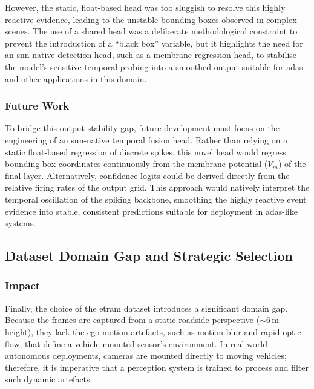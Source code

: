 However, the static, float-based head was too sluggish to resolve this highly reactive evidence, leading to the unstable bounding boxes observed in complex scenes. 
The use of a shared head was a deliberate methodological constraint to prevent the introduction of a ``black box'' variable, but it highlights the need for an \gls{snn}-native detection head, such as a membrane-regression head, to stabilise the model's sensitive temporal probing into a smoothed output suitable for \gls{adas} and other applications in this domain.

\subsubsection*{Future Work}
To bridge this output stability gap, future development must focus on the engineering of an \gls{snn}-native temporal fusion head. Rather than relying on a static float-based regression of discrete spikes, this novel head would regress bounding box coordinates continuously from the membrane potential ($V_m$) of the final layer. Alternatively, confidence logits could be derived directly from the relative firing rates of the output grid. 
This approach would natively interpret the temporal oscillation of the spiking backbone, smoothing the highly reactive event evidence into stable, consistent predictions suitable for deployment in \gls{adas}-like systems.

\subsection{Dataset Domain Gap and Strategic Selection}

\subsubsection*{Impact}
Finally, the choice of the \gls{etram} dataset \parencite{Verma_2024_CVPR} introduces a significant domain gap. 
Because the frames are captured from a static roadside perspective ($\sim$6\,m height), they lack the ego-motion artefacts, such as motion blur and rapid optic flow, that define a vehicle-mounted sensor's environment. In real-world autonomous deployments, cameras are mounted directly to moving vehicles; therefore, it is imperative that a perception system is trained to process and filter such dynamic artefacts.

